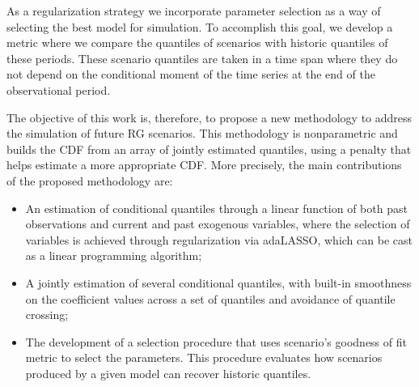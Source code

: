 As a regularization strategy we incorporate parameter selection as a way of selecting the best model for simulation. To accomplish this goal, we develop a metric where we compare the quantiles of scenarios with historic quantiles of these periods. These scenario quantiles are taken in a time span where they do not depend on the conditional moment of the time series at the end of the observational period. 
 
The objective of this work is, therefore, to propose a new methodology to address the simulation of future RG scenarios. This methodology is nonparametric and builds the CDF from an array of jointly estimated quantiles, using a penalty that helps estimate a more appropriate CDF. More precisely, the main contributions of the proposed methodology are:
\begin{itemize}
	\item An estimation of conditional quantiles through a linear function of both past observations and current and past exogenous variables, where the selection of variables is achieved through regularization via adaLASSO, which can be cast as a linear programming algorithm;
	\item A jointly estimation of several conditional quantiles, with built-in smoothness on the coefficient values across a set of quantiles and avoidance of quantile crossing;
	\item The development of a selection procedure that uses scenario's goodness of fit metric to select the parameters. This procedure evaluates how scenarios produced by a given model can recover historic quantiles.
\end{itemize}




